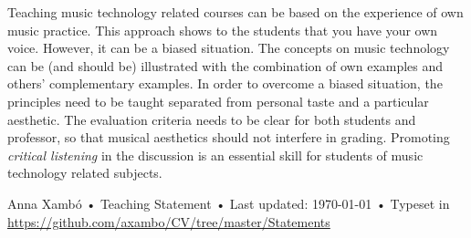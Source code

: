\documentclass[10pt, a4paper]{article}
\begin{document}
Teaching music technology related courses can be based on the experience of own music practice. This approach shows to the students that you have your own voice. However, it can be a biased situation. The concepts on music technology can be (and should be) illustrated with the combination of own examples and others' complementary examples. In order to overcome a biased situation, the principles need to be taught separated from  personal taste and a particular aesthetic. The evaluation criteria needs to be clear for both students and professor, so that musical aesthetics should not interfere in grading. Promoting \emph{critical listening} in the discussion is an essential skill for students of music technology related subjects. 

\vfill{}

\begin{center}
{\scriptsize  Anna Xambó •\- Teaching Statement •\- Last updated: \today\- •\- %
Typeset in \href{http://nitens.org/taraborelli/cvtex}{
\XeTeX }\\
\href{https://github.com/axambo/CV/tree/master/Statements}{https://github.com/axambo/CV/tree/master/Statements}}
\end{center}
\end{document}
